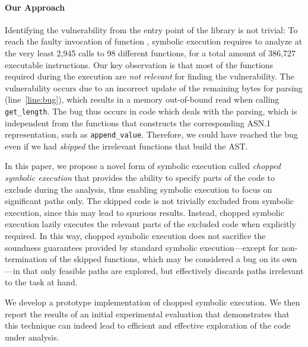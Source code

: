 \paragraph{Our Approach}
Identifying the vulnerability from the entry point of the library is
not trivial: To reach the faulty invocation of function ,
symbolic execution requires to analyze at the very least 2,945 calls
to 98 different functions, for a total amount of 386,727 executable
instructions. Our key observation is that most of the functions
required during the execution are \textit{not relevant} for finding
the vulnerability. The vulnerability occurs due to an incorrect update
of the remaining bytes for parsing (line~\ref{line:bug}), which
results in a memory out-of-bound read when calling
\texttt{get\_length}. The bug thus occurs in code which deals with the
parsing, which is independent from the functions that constructs the
corresponding ASN.1 representation, such as \texttt{append\_value}.
Therefore, we could have reached the bug even if we had \emph{skipped}
the irrelevant functions that build the AST.

In this paper, we propose a novel form of symbolic execution called
\emph{chopped symbolic execution} that provides the ability to specify
parts of the code to exclude during the analysis, thus enabling
symbolic execution to focus on significant paths only. The skipped
code is not trivially excluded from symbolic execution, since this may
lead to spurious results. Instead, chopped symbolic execution lazily
executes the relevant parts of the excluded code when explicitly
required. In this way, chopped symbolic execution does not sacrifice
the soundness guarantees provided by standard symbolic
execution---except for non-termination of the skipped functions, which
may be considered a bug on its own---in that only feasible paths are
explored, but effectively discards paths irrelevant to the task at
hand.

We develop a prototype implementation of chopped symbolic
execution. We then report the results of an initial experimental
evaluation that demonstrates that this technique can indeed lead to
efficient and effective exploration of the code under analysis.

